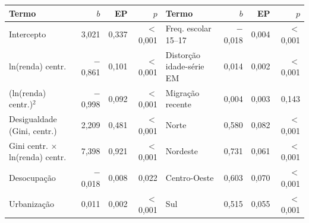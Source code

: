 \begin{tabular*}{\textwidth}{@{\extracolsep{\fill}}lrrrlrrr@{}}
\toprule
\textbf{Termo} & \textbf{$b$} & \textbf{EP} & \textbf{$p$} & \textbf{Termo} & \textbf{$b$} & \textbf{EP} & \textbf{$p$}\\
\midrule
Intercepto & 3,021 & 0,337 & $<$0,001 & Freq. escolar 15--17 & $-$0,018 & 0,004 & $<$0,001\\
ln(renda) centr. & $-$0,861 & 0,101 & $<$0,001 & Distorção idade-série EM & 0,014 & 0,002 & $<$0,001\\
(ln(renda) centr.)$^2$ & $-$0,998 & 0,092 & $<$0,001 & Migração recente & 0,004 & 0,003 & 0,143\\
Desigualdade (Gini, centr.) & 2,209 & 0,481 & $<$0,001 & Norte & 0,580 & 0,082 & $<$0,001\\
Gini centr. $\times$ ln(renda) centr. & 7,398 & 0,921 & $<$0,001 & Nordeste & 0,731 & 0,061 & $<$0,001\\
Desocupação & $-$0,018 & 0,008 & 0,022 & Centro-Oeste & 0,603 & 0,070 & $<$0,001\\
Urbanização & 0,011 & 0,002 & $<$0,001 & Sul & 0,515 & 0,055 & $<$0,001\\
\bottomrule
\end{tabular*}
